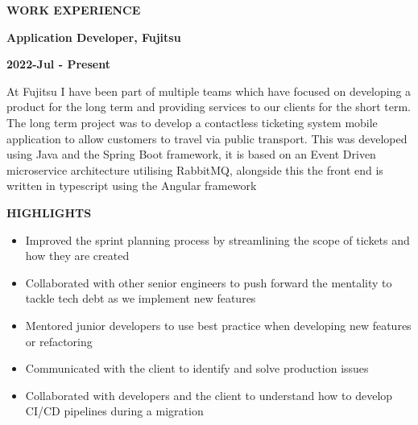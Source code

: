 \documentclass[10pt, a4paper]{article}
\begin{document}
    \vspace*{0.5in}
    {\large {} \enspace \textbf{WORK EXPERIENCE}} \par
    {\textbf{Application Developer, Fujitsu}} \par
    {\textbf{2022-Jul - Present}} \par
    At Fujitsu I have been part of multiple teams which have focused on developing a product for the long term and providing services to our clients for the short term. The long term project was to develop a contactless ticketing system mobile application to allow customers to travel via public transport. This was developed using Java and the Spring Boot framework, it is based on an Event Driven microservice architecture utilising RabbitMQ, alongside this the front end is written in typescript using the Angular framework \par
    {\textbf{HIGHLIGHTS}} \par
    \begin{itemize}[label={\large\textbullet}]
      \item Improved the sprint planning process by streamlining the scope of tickets and how they are created
      \item Collaborated with other senior engineers to push forward the mentality to tackle tech debt as we implement new features
      \item Mentored junior developers to use best practice when developing new features or refactoring
      \item Communicated with the client to identify and solve production issues
      \item Collaborated with developers and the client to understand how to develop CI/CD pipelines during a migration
    \end{itemize}
\end{document}
